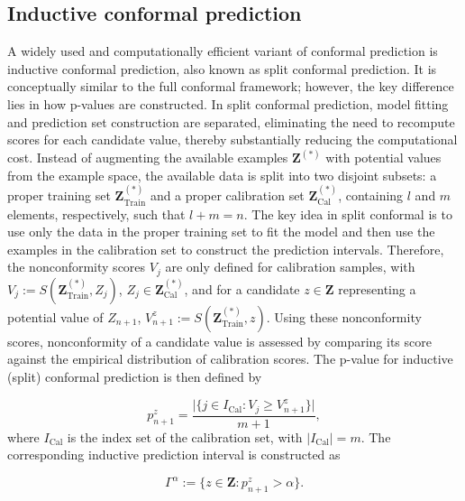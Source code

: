 \newtheorem{result}{Result}

\subsection{Inductive conformal prediction}\label{inductive-conformal-prediction}

A widely used and computationally efficient variant of conformal
prediction is inductive conformal prediction, also known as split
conformal prediction. It is conceptually similar to the full conformal
framework; however, the key difference lies in how p-values are
constructed. In split conformal prediction, model fitting and prediction
set construction are separated, eliminating the need to recompute scores
for each candidate value, thereby substantially reducing the
computational cost. Instead of augmenting the available examples
\(\textbf{Z}^{(*)}\) with potential values from the example space, the
available data is split into two disjoint subsets: a proper training set
\(\textbf{Z}^{(*)}_\text{Train}\) and a proper calibration set
\(\textbf{Z}^{(*)}_\text{Cal}\), containing \(l\) and \(m\) elements,
respectively, such that \(l + m = n\). The key idea in split conformal is
to use only the data in the proper training set to fit the model and
then use the examples in the calibration set to construct the prediction
intervals. Therefore, the nonconformity scores \(V_j\) are only defined
for calibration samples, with
\(V_j := S(\textbf{Z}^{(*)}_\text{Train},Z_j)\),
\(Z_j\in \textbf{Z}^{(*)}_\text{Cal}\), and for a candidate
\(z\in \textbf{Z}\) representing a potential value of \(Z_{n+1}\),
\(V_{n+1}^{z} := S(\textbf{Z}^{(*)}_\text{Train},z)\). Using these
nonconformity scores, nonconformity of a candidate value is assessed by
comparing its score against the empirical distribution of calibration
scores. The p-value for inductive (split) conformal prediction is then
defined by

\begin{equation}
p_{n+1}^{z} = \dfrac{\lvert \{j\in I_\text{Cal}: V_j\geq V_{n+1}^{z}\} \rvert}{m+1},
\label{eq:scp-pval}
\end{equation} where \(I_\text{Cal}\) is the index set of the
calibration set, with \(|I_\text{Cal}|=m\). The corresponding
inductive prediction interval is constructed as

\begin{equation}
\Gamma^{\alpha}:=\{ z\in \textbf{Z}: p_{n+1}^{z} > \alpha \}.
\label{eq:scp-predset}
\end{equation}

